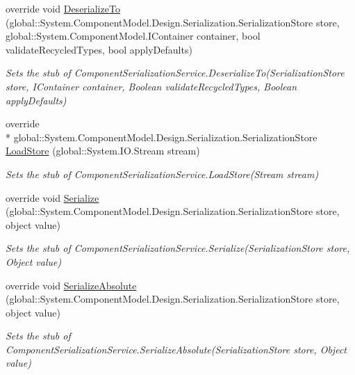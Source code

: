 \begin{DoxyCompactItemize}
override void \hyperlink{class_system_1_1_component_model_1_1_design_1_1_serialization_1_1_fakes_1_1_stub_component_serialization_service_a2f0965ef6f577cd4fba6dfa432a8d4a7}{Deserialize\-To} (global\-::\-System.\-Component\-Model.\-Design.\-Serialization.\-Serialization\-Store store, global\-::\-System.\-Component\-Model.\-I\-Container container, bool validate\-Recycled\-Types, bool apply\-Defaults)
\begin{DoxyCompactList}\small\item\em Sets the stub of Component\-Serialization\-Service.\-Deserialize\-To(\-Serialization\-Store store, I\-Container container, Boolean validate\-Recycled\-Types, Boolean apply\-Defaults)\end{DoxyCompactList}\item 
override \\*
global\-::\-System.\-Component\-Model.\-Design.\-Serialization.\-Serialization\-Store \hyperlink{class_system_1_1_component_model_1_1_design_1_1_serialization_1_1_fakes_1_1_stub_component_serialization_service_aa76c189bfd69d9a876ad7d8ff0eee73f}{Load\-Store} (global\-::\-System.\-I\-O.\-Stream stream)
\begin{DoxyCompactList}\small\item\em Sets the stub of Component\-Serialization\-Service.\-Load\-Store(\-Stream stream)\end{DoxyCompactList}\item 
override void \hyperlink{class_system_1_1_component_model_1_1_design_1_1_serialization_1_1_fakes_1_1_stub_component_serialization_service_a631f5d4af31833d0d96573dc6728885d}{Serialize} (global\-::\-System.\-Component\-Model.\-Design.\-Serialization.\-Serialization\-Store store, object value)
\begin{DoxyCompactList}\small\item\em Sets the stub of Component\-Serialization\-Service.\-Serialize(\-Serialization\-Store store, Object value)\end{DoxyCompactList}\item 
override void \hyperlink{class_system_1_1_component_model_1_1_design_1_1_serialization_1_1_fakes_1_1_stub_component_serialization_service_afb5a1ae1f9eaf7bd516b9e59d952fb25}{Serialize\-Absolute} (global\-::\-System.\-Component\-Model.\-Design.\-Serialization.\-Serialization\-Store store, object value)
\begin{DoxyCompactList}\small\item\em Sets the stub of Component\-Serialization\-Service.\-Serialize\-Absolute(\-Serialization\-Store store, Object value)\end{DoxyCompactList}\item 

\end{DoxyCompactItemize}
